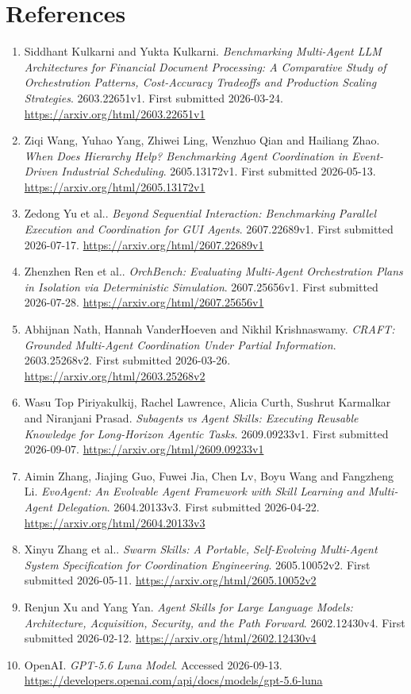 \clearpage
\section*{References}
\begingroup\small
\begin{enumerate}
\item Siddhant Kulkarni and Yukta Kulkarni. \textit{Benchmarking Multi-Agent LLM Architectures for Financial Document Processing: A Comparative Study of Orchestration Patterns, Cost-Accuracy Tradeoffs and Production Scaling Strategies}. 2603.22651v1. First submitted 2026-03-24. \url{https://arxiv.org/html/2603.22651v1}
\item Ziqi Wang, Yuhao Yang, Zhiwei Ling, Wenzhuo Qian and Hailiang Zhao. \textit{When Does Hierarchy Help? Benchmarking Agent Coordination in Event-Driven Industrial Scheduling}. 2605.13172v1. First submitted 2026-05-13. \url{https://arxiv.org/html/2605.13172v1}
\item Zedong Yu et al.. \textit{Beyond Sequential Interaction: Benchmarking Parallel Execution and Coordination for GUI Agents}. 2607.22689v1. First submitted 2026-07-17. \url{https://arxiv.org/html/2607.22689v1}
\item Zhenzhen Ren et al.. \textit{OrchBench: Evaluating Multi-Agent Orchestration Plans in Isolation via Deterministic Simulation}. 2607.25656v1. First submitted 2026-07-28. \url{https://arxiv.org/html/2607.25656v1}
\item Abhijnan Nath, Hannah VanderHoeven and Nikhil Krishnaswamy. \textit{CRAFT: Grounded Multi-Agent Coordination Under Partial Information}. 2603.25268v2. First submitted 2026-03-26. \url{https://arxiv.org/html/2603.25268v2}
\item Wasu Top Piriyakulkij, Rachel Lawrence, Alicia Curth, Sushrut Karmalkar and Niranjani Prasad. \textit{Subagents vs Agent Skills: Executing Reusable Knowledge for Long-Horizon Agentic Tasks}. 2609.09233v1. First submitted 2026-09-07. \url{https://arxiv.org/html/2609.09233v1}
\item Aimin Zhang, Jiajing Guo, Fuwei Jia, Chen Lv, Boyu Wang and Fangzheng Li. \textit{EvoAgent: An Evolvable Agent Framework with Skill Learning and Multi-Agent Delegation}. 2604.20133v3. First submitted 2026-04-22. \url{https://arxiv.org/html/2604.20133v3}
\item Xinyu Zhang et al.. \textit{Swarm Skills: A Portable, Self-Evolving Multi-Agent System Specification for Coordination Engineering}. 2605.10052v2. First submitted 2026-05-11. \url{https://arxiv.org/html/2605.10052v2}
\item Renjun Xu and Yang Yan. \textit{Agent Skills for Large Language Models: Architecture, Acquisition, Security, and the Path Forward}. 2602.12430v4. First submitted 2026-02-12. \url{https://arxiv.org/html/2602.12430v4}
\item OpenAI. \textit{GPT-5.6 Luna Model}. Accessed 2026-09-13. \url{https://developers.openai.com/api/docs/models/gpt-5.6-luna}
\end{enumerate}
\endgroup
